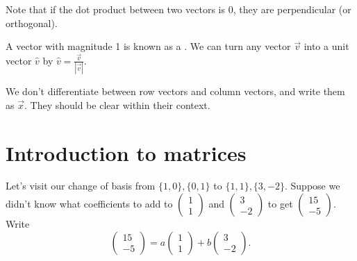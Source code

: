 \documentclass[a4paper, 12pt,oneside,openany]{book}
\begin{document}

Note that if the dot product between two vectors is 0, they are perpendicular (or orthogonal).


A vector with magnitude 1 is known as a . We can turn any vector $\vec{v}$ into a unit vector $\hat{v}$ by $\hat{v} = \frac{\vec{v}}{|\vec{v}|}.$

 We don't differentiate between row vectors and column vectors, and write them as $\vec{x}$. They should be clear within their context.

\section{Introduction to matrices}

Let's visit our change of basis from $\{1, 0\}, \{0, 1\}$ to $\{1, 1\}, \{3, -2\}$. Suppose we didn't know what coefficients to add to $\begin{pmatrix} 1 \\ 1 \end{pmatrix}$ and $\begin{pmatrix} 3 \\ -2 \end{pmatrix}$ to get $\begin{pmatrix} 15 \\ -5 \end{pmatrix}.$ Write $$\begin{pmatrix} 15 \\ -5 \end{pmatrix} = a \begin{pmatrix} 1 \\ 1 \end{pmatrix} + b\begin{pmatrix} 3 \\ -2 \end{pmatrix}.$$
\end{document}
